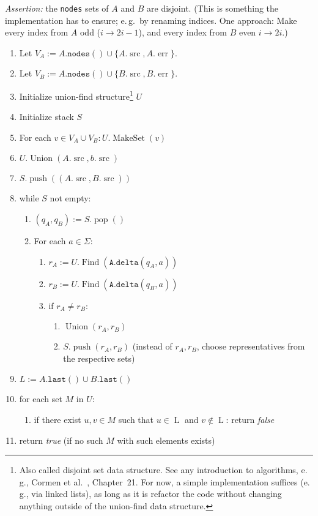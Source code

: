 \documentclass[a4paper,11pt, svgnames,titlepage]{article}
\newcommand{\df}{:=}
\DeclareMathOperator{\src}{src}
\DeclareMathOperator{\err}{err}
\DeclareMathOperator{\makeset}{MakeSet}
\DeclareMathOperator{\union}{Union}
\DeclareMathOperator{\find}{Find}
\DeclareMathOperator{\push}{push}
\DeclareMathOperator{\pop}{pop}
\DeclareMathOperator{\last}{L}
\begin{document}
\emph{Assertion:} the \texttt{nodes} sets of $A$ and $B$ are disjoint. (This is something the implementation has to ensure; e.\,g.\ by renaming indices. One approach: Make every index from $A$ odd ($i\to 2i-1$), and every index from $B$ even $i\to 2i$.)
\begin{enumerate}
	\item Let $V_A\df A.\mathtt{nodes()}\cup\{A.\src,A.\err\}$.
	\item Let $V_B\df A.\mathtt{nodes()}\cup\{B.\src,B.\err\}$.
	\item Initialize union-find structure\footnote{Also called disjoint set data structure. See any introduction to algorithms, e.\,g., Cormen et al.~\cite{cor:int}, Chapter~21. For now, a simple implementation suffices (e.\,g., via linked lists), as long as it is refactor the code without changing anything outside of the union-find data structure.} $U$
	\item Initialize stack $S$
	\item For each $v\in V_A\cup V_B: U.\makeset(v)$ 
	\item $U.\union(A.\src,b.\src)$
	\item $S.\push((A.\src,B.\src))$
	\item while $S$ not empty:
	\begin{enumerate}[label*=\arabic*.]
		\item $(q_A,q_B)\df S.\pop()$
		\item For each $a\in \Sigma$:
		\begin{enumerate}[label*=\arabic*.]
			\item $r_A\df U.\find(\mathtt{A.delta}(q_A,a))$ 
			\item $r_B\df U.\find(\mathtt{A.delta}(q_B,a))$ 
			\item if $r_A\neq r_B$:
			\begin{enumerate}[label*=\arabic*.]
				\item $\union(r_A,r_B)$
				\item $S.\push(r_A,r_B)$ (instead of $r_A,r_B$, choose representatives from the respective sets)
			\end{enumerate} 
		\end{enumerate}
	\end{enumerate}
	\item $L\df A.\mathtt{last}()\cup B.\mathtt{last}()$
	\item for each set $M$ in $U$:
	\begin{enumerate}[label*=\arabic*.]
		\item if there exist $u,v\in M$ such that $u\in\last$ and $v\notin\last$: return \emph{false}
	\end{enumerate}
	\item return \emph{true} (if no such $M$ with such elements exists)
\end{enumerate}
\newpage
{}


\newpage
\end{document}
